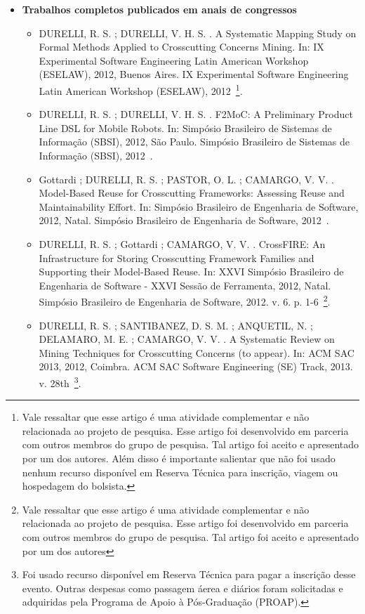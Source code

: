 \begin{itemize}
	\item \textbf{Trabalhos completos publicados em anais de congressos}
	\begin{itemize}
	 	\item DURELLI, R. S. ; DURELLI, V. H. S. . A Systematic Mapping Study on Formal Methods Applied to Crosscutting Concerns Mining. In: IX Experimental Software Engineering Latin American Workshop (ESELAW), 2012, Buenos Aires. IX Experimental Software Engineering Latin American Workshop (ESELAW), 2012~\footnote{\label{note1}Vale ressaltar que esse artigo é uma atividade complementar e não relacionada ao projeto de pesquisa. Esse artigo foi desenvolvido em parceria com outros membros do grupo de pesquisa. Tal artigo foi aceito e apresentado por um dos autores. Além disso é importante salientar que não foi usado nenhum recurso disponível em Reserva Técnica para inscrição, viagem ou hospedagem do bolsista.}.
	 	\item DURELLI, R. S. ; DURELLI, V. H. S. . F2MoC: A Preliminary Product Line DSL for Mobile Robots. In: Simpósio Brasileiro de Sistemas de Informação (SBSI), 2012, São Paulo. Simpósio Brasileiro de Sistemas de Informação (SBSI), 2012~.
	 	\item Gottardi ; DURELLI, R. S. ; PASTOR, O. L. ; CAMARGO, V. V. . Model-Based Reuse for Crosscutting Frameworks: Assessing Reuse and Maintainability Effort. In: Simpósio Brasileiro de Engenharia de Software, 2012, Natal. Simpósio Brasileiro de Engenharia de Software, 2012~.
	 	\item DURELLI, R. S. ; Gottardi ; CAMARGO, V. V. . CrossFIRE: An Infrastructure for Storing Crosscutting Framework Families and Supporting their Model-Based Reuse. In: XXVI Simpósio Brasileiro de Engenharia de Software - XXVI Sessão de Ferramenta, 2012, Natal. Simpósio Brasileiro de Engenharia de Software, 2012. v. 6. p. 1-6~\footnote{\label{note2}Vale ressaltar que esse artigo é uma atividade complementar e não relacionada ao projeto de pesquisa. Esse artigo foi desenvolvido em parceria com outros membros do grupo de pesquisa. Tal artigo foi aceito e apresentado por um dos autores}.
	 	\item DURELLI, R. S. ; SANTIBANEZ, D. S. M. ; ANQUETIL, N. ; DELAMARO, M. E. ; CAMARGO, V. V. . A Systematic Review on Mining Techniques for Crosscutting Concerns (to appear). In: ACM SAC 2013, 2012, Coimbra. ACM SAC Software Engineering (SE) Track, 2013. v. 28th~\footnote{Foi usado recurso disponível em Reserva Técnica para pagar a inscrição desse evento. Outras despesas como passagem áerea e diários foram solicitadas e adquiridas pela Programa de Apoio à Pós-Graduação (PROAP).}.
	 \end{itemize}


\end{itemize}
